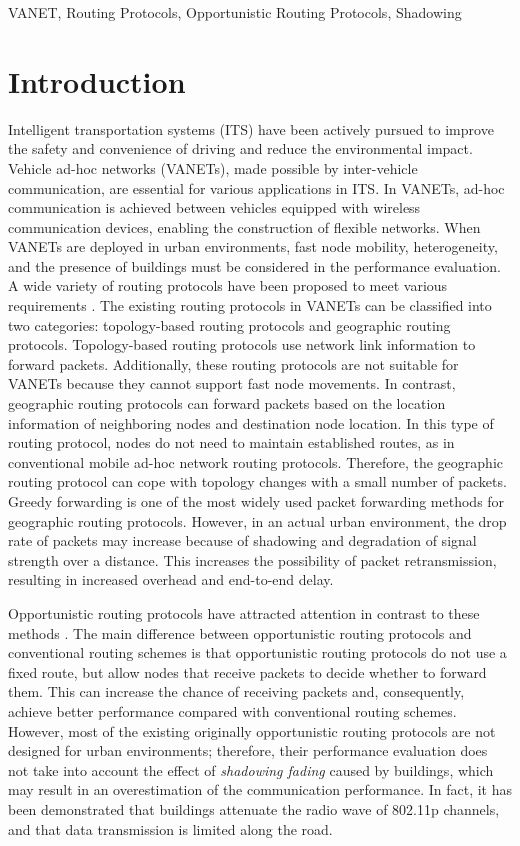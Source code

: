 \documentclass[conference]{IEEEtran}
\begin{document}
\begin{IEEEkeywords}
VANET, Routing Protocols, Opportunistic Routing Protocols, Shadowing
\end{IEEEkeywords}

\section{Introduction}
Intelligent transportation systems (ITS) \cite{1} have been actively pursued to improve the safety and convenience of driving and  reduce the environmental impact. 
Vehicle ad-hoc networks (VANETs), made possible by inter-vehicle communication, are essential for various applications in ITS.
In VANETs,  ad-hoc communication is achieved between vehicles equipped with wireless communication devices, enabling the construction of flexible networks. 
When VANETs are deployed in  urban environments, fast node mobility, heterogeneity, and the presence of buildings must be considered in the performance evaluation. A wide variety of routing protocols have been proposed to meet various requirements \cite{2}.
The existing routing protocols in VANETs can be classified into two categories: topology-based routing protocols and geographic routing protocols. Topology-based routing protocols \cite{3,4,5} use network link information to forward packets. 
Additionally, these routing protocols are not suitable for VANETs because they cannot support fast node movements. In contrast, geographic routing protocols \cite{6,7,8,9,10,11,12,13,14,15} can forward packets based on the location information of neighboring nodes and destination node location. 
In this type of routing protocol, nodes do not need to maintain established routes, as in conventional mobile ad-hoc network routing protocols. 
Therefore, the geographic routing protocol can cope with topology changes with a small number of packets.
Greedy forwarding is one of the most widely used packet forwarding methods for geographic routing protocols.
However, in an actual urban environment, the drop rate of packets may increase because of shadowing and degradation of signal strength over a distance. This increases the possibility of packet retransmission, resulting in increased overhead and end-to-end delay. 

Opportunistic routing protocols have attracted attention in contrast to these methods \cite{16}. 
The main difference between opportunistic routing protocols and conventional routing schemes is that opportunistic routing protocols do not use a fixed route, but allow nodes that receive packets to decide whether to forward them. 
This can increase the chance of receiving packets and, consequently, achieve better performance compared with conventional routing schemes.
However, most of the existing originally opportunistic routing protocols  are not designed for urban environments; therefore, their performance evaluation does not take into account the effect of \textit{shadowing fading} caused by buildings, which may result in an overestimation of the communication performance. 
In fact, it has been demonstrated that buildings attenuate the radio wave of 802.11p channels, and that data transmission is limited along the road\cite{17}. 
\end{document}
